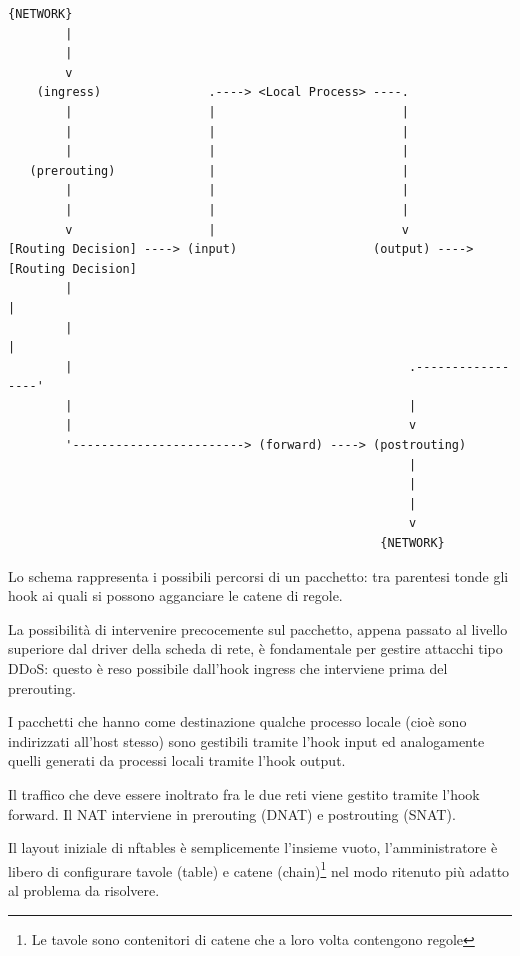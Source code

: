 \begin{Verbatim}[fontsize=\scriptsize, fontseries=b, fontfamily=courier, samepage=true]
    {NETWORK}
        |
        |
        v                   
    (ingress)               .----> <Local Process> ----.
        |                   |                          |
        |                   |                          |
        |                   |                          |
   (prerouting)             |                          |
        |                   |                          |
        |                   |                          |
        v                   |                          v
[Routing Decision] ----> (input)                   (output) ----> [Routing Decision]
        |                                                                 |
        |                                                                 |
        |                                               .-----------------'
        |                                               |
        |                                               v
        '------------------------> (forward) ----> (postrouting)
                                                        |
                                                        |
                                                        |
                                                        v
                                                    {NETWORK}
\end{Verbatim}

Lo schema rappresenta i possibili percorsi di un pacchetto: tra parentesi tonde
gli hook ai quali si possono agganciare le catene di regole.

La possibilit\`a di intervenire precocemente sul pacchetto, appena passato al
livello superiore dal driver della scheda di rete, \`e fondamentale per
gestire attacchi tipo DDoS: questo \`e reso possibile dall'hook ingress che
interviene prima del prerouting.

I pacchetti che hanno come destinazione qualche processo locale (cioè sono
indirizzati all'host stesso) sono gestibili tramite l'hook input ed
analogamente quelli generati da processi locali tramite l'hook output.

Il traffico che deve essere inoltrato fra le due reti viene gestito tramite
l'hook forward. Il NAT interviene in prerouting (DNAT) e postrouting (SNAT).

Il layout iniziale di nftables \`e semplicemente l'insieme vuoto,
l'amministratore \`e libero di configurare tavole (table) e catene
(chain)\footnote{Le tavole sono contenitori di catene che a loro volta
contengono regole} nel modo ritenuto pi\`u adatto al problema da risolvere.

